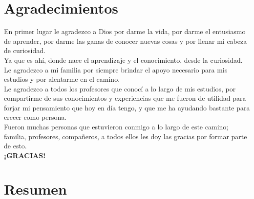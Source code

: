 \documentclass[12pt,titlepage]{article}
\begin{document}
\section*{Agradecimientos}
En primer lugar le agradezco a Dios por darme la vida, por darme el entusiasmo de aprender, por darme las ganas de conocer nuevas cosas y por llenar mi cabeza de curiosidad. \\

Ya que es ahí, donde nace el aprendizaje y el conocimiento, desde la curiosidad. \\

Le agradezco a mi familia por siempre brindar el apoyo necesario para mis estudios y por alentarme en el camino. \\

Le agradezco a todos los  profesores que conocí a lo largo de mis estudios, por compartirme de sus conocimientos y experiencias que me fueron de utilidad para forjar mi pensamiento que hoy en día tengo, y que me ha ayudando bastante para crecer como persona. \\





Fueron muchas personas que estuvieron conmigo a lo largo de este camino; familia, profesores, compañeros, a todos ellos les doy las gracias por formar parte de esto. \\

\textbf{¡GRACIAS!}
 
\newpage
\section*{Resumen}
\newpage
{}
\tableofcontents %
\newpage %
\listoffigures %
\newpage
\listoftables %
\newpage
\end{document}
